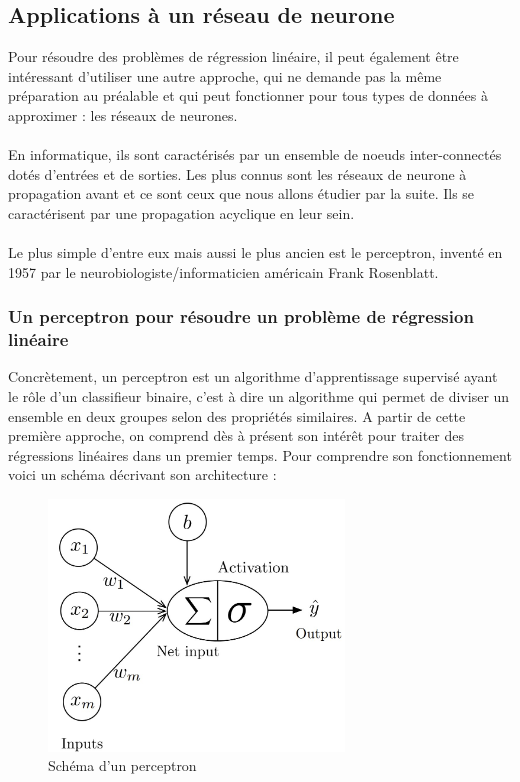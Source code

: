     \subsection{Applications à un réseau de neurone}
    Pour résoudre des problèmes de régression linéaire, il peut également être intéressant d'utiliser une autre approche, qui ne demande pas la même préparation au préalable et qui peut fonctionner pour tous types de données à approximer : les réseaux de neurones.\\\\
    En informatique, ils sont caractérisés par un ensemble de noeuds inter-connectés dotés d'entrées et de sorties. Les plus connus sont les réseaux de neurone à propagation avant et ce sont ceux que nous allons étudier par la suite. Ils se caractérisent par une propagation acyclique en leur sein.\\\\
    Le plus simple d'entre eux mais aussi le plus ancien est le perceptron, inventé en 1957 par le neurobiologiste/informaticien américain Frank Rosenblatt.
    \subsubsection{Un perceptron pour résoudre un problème de régression linéaire}
    Concrètement, un perceptron est un algorithme d'apprentissage supervisé ayant le rôle d'un classifieur binaire, c'est à dire un algorithme qui permet de diviser un ensemble en deux groupes selon des propriétés similaires. A partir de cette première approche, on comprend dès à présent son intérêt pour traiter des régressions linéaires dans un premier temps. Pour comprendre son fonctionnement voici un schéma décrivant son architecture : 
    \begin{figure}[H]
              \centering
                \includegraphics[width=0.7\textwidth]{images/perceptron.jpg}
              \caption{Schéma d'un perceptron}
              \label{fig:rn1}
            \end{figure}

